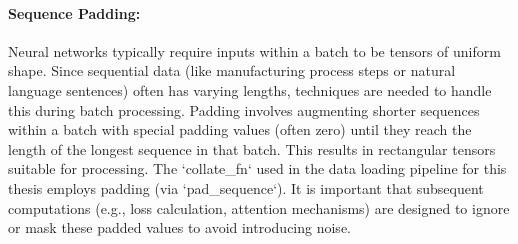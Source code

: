 \begin{appendices}
  \paragraph{Sequence Padding:}
  Neural networks typically require inputs within a batch to be tensors of uniform shape. Since sequential data (like manufacturing process steps or natural language sentences) often has varying lengths, techniques are needed to handle this during batch processing. Padding involves augmenting shorter sequences within a batch with special padding values (often zero) until they reach the length of the longest sequence in that batch. This results in rectangular tensors suitable for processing. The `collate_fn` used in the data loading pipeline for this thesis employs padding (via `pad_sequence`). It is important that subsequent computations (e.g., loss calculation, attention mechanisms) are designed to ignore or mask these padded values to avoid introducing noise.

\end{appendices}